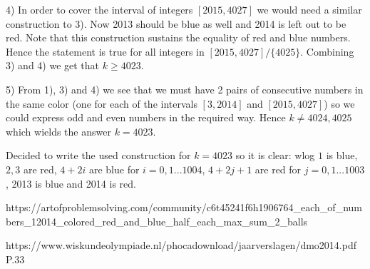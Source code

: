 \documentclass[a4paper]{article}
\begin{document}
\begin{question*}{}
{        4) In order to cover the interval of integers $[2015, 4027]$ we would need a similar construction to 3). Now 2013 should be blue as well and 2014 is left out to be red. Note that this construction sustains the equality of red and blue numbers. Hence the statement is true for all integers in $[2015,4027]/\{4025\}$.
        Combining 3) and 4) we get that $k\geq 4023$.

        5) From 1), 3) and 4) we see that we must have 2 pairs of consecutive numbers in the same color (one for each of the intervals $[3, 2014]$ and $[2015, 4027]$) so we could express odd and even numbers in the required way. Hence $k\neq 4024, 4025$ which wields the answer $k=4023$.

        Decided to write the used construction for $k=4023$ so it is clear:
        wlog $1$ is blue, $2, 3$ are red, $4+2i$ are blue for $i=0,1...1004$, $4+2j+1$ are red for $j=0,1...1003$, 2013 is blue and 2014 is red.
        }{%
        https://artofproblemsolving.com/community/c6t45241f6h1906764_each_of_numbers_12014_colored_red_and_blue_half_each_max_sum_2_balls

        https://www.wiskundeolympiade.nl/phocadownload/jaarverslagen/dmo2014.pdf
        P.33
    }

\end{question*}
\end{document}

